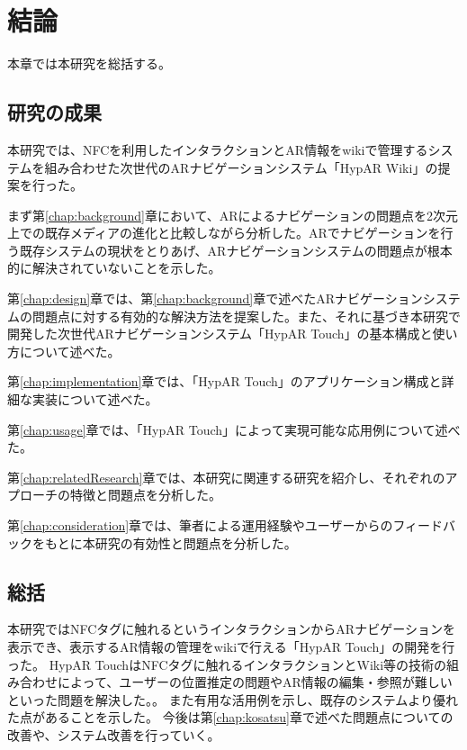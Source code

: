 \chapter{結論}
\label{chap:conclusion}

本章では本研究を総括する。

\newpage



\section{研究の成果}
本研究では、NFCを利用したインタラクションとAR情報をwikiで管理するシステムを組み合わせた次世代のARナビゲーションシステム「HypAR Wiki」の提案を行った。

まず第\ref{chap:background}章において、ARによるナビゲーションの問題点を2次元上での既存メディアの進化と比較しながら分析した。ARでナビゲーションを行う既存システムの現状をとりあげ、ARナビゲーションシステムの問題点が根本的に解決されていないことを示した。

第\ref{chap:design}章では、第\ref{chap:background}章で述べたARナビゲーションシステムの問題点に対する有効的な解決方法を提案した。また、それに基づき本研究で開発した次世代ARナビゲーションシステム「HypAR Touch」の基本構成と使い方について述べた。

第\ref{chap:implementation}章では、「HypAR Touch」のアプリケーション構成と詳細な実装について述べた。

第\ref{chap:usage}章では、「HypAR Touch」によって実現可能な応用例について述べた。

第\ref{chap:relatedResearch}章では、本研究に関連する研究を紹介し、それぞれのアプローチの特徴と問題点を分析した。

第\ref{chap:consideration}章では、筆者による運用経験やユーザーからのフィードバックをもとに本研究の有効性と問題点を分析した。

\section{総括}
本研究ではNFCタグに触れるというインタラクションからARナビゲーションを表示でき、表示するAR情報の管理をwikiで行える「HypAR Touch」の開発を行った。
HypAR TouchはNFCタグに触れるインタラクションとWiki等の技術の組み合わせによって、ユーザーの位置推定の問題やAR情報の編集・参照が難しいといった問題を解決した。。
また有用な活用例を示し、既存のシステムより優れた点があることを示した。
今後は第\ref{chap:kosatsu}章で述べた問題点についての改善や、システム改善を行っていく。